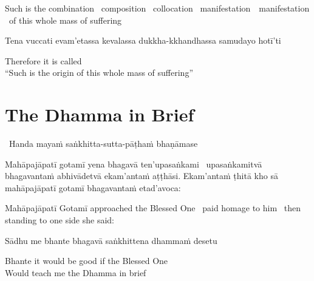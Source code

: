 \begin{english-hang}
  Such is the combination \breathmark\ composition \breathmark\ collocation \breathmark\ \ifbfiveversion \mbox{manifestation}~\breathmark\ \else manifestation \breathmark\ \fi of this whole mass of suffering
\end{english-hang}

\begin{pali-hang}
  Tena vuccati evam'etassa kevalassa dukkha-kkhandhassa samudayo hotī'ti
\end{pali-hang}

\begin{english}
  Therefore it is called\\
  ``Such is the origin of this whole mass of suffering''
\end{english}

\suttaRef{[Vibh 130 / SN 12.2]}

\ifdigitalversion{}\fi



\section{The Dhamma in Brief}
\label{dhamma-in-brief}

\begin{leader}
  \anglebracketleft\ \hspace{-0.5mm}Handa mayaṁ saṅkhitta-sutta-pāṭhaṁ bhaṇāmase \hspace{-0.5mm}\anglebracketright\
\end{leader}

\begin{pali-hang}
  Mahāpajāpatī gotamī yena bhagavā ten'upasaṅkami \breathmark\ upasaṅkamitvā bhagavantaṁ abhivādetvā ekam'antaṁ aṭṭhāsi. Ekam'antaṁ ṭhitā kho sā mahāpajāpatī gotamī bhagavantaṁ etad'avoca:
\end{pali-hang}

\begin{english-hang}
  Mahāpajāpatī Gotamī approached the Blessed One \breathmark\ paid homage to him \breathmark\ then standing to one side she said:
\end{english-hang}

Sādhu me bhante bhagavā saṅkhittena dhammaṁ desetu

\begin{english}
  Bhante it would be good if the Blessed One\\
  Would teach me the Dhamma in brief
\end{english}


